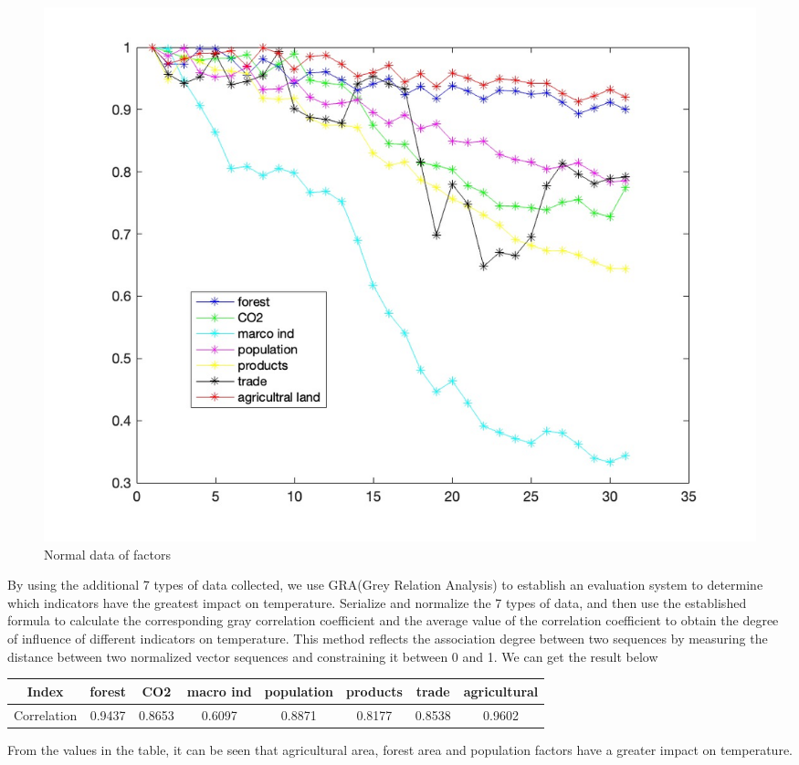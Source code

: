 \documentclass{apmcmthesis}
\begin{document}
\begin{figure}[htbp]
  \centering
  \includegraphics[scale=0.25]{2c2.jpg}
  \caption{Normal data of factors}
\end{figure}

By using the additional 7 types of data collected, we use GRA(Grey Relation Analysis) to establish an evaluation system to determine which indicators have the greatest impact on temperature.
Serialize and normalize the 7 types of data, and then use the established formula to calculate the corresponding gray correlation coefficient and the average value of the correlation coefficient to obtain the degree of influence of different indicators on temperature. This method reflects the association degree between two sequences by measuring the distance between two normalized vector sequences and constraining it between 0 and 1.
We can get the result below
\begin{center}
  \begin{tabular}{c|ccccccc}
    \hline
    Index &forest& CO2 & macro ind & population & products & trade & agricultural\\
    \hline
    Correlation & 0.9437&	0.8653&	0.6097&	0.8871&	0.8177&	0.8538&	0.9602\\
    \hline
    \end{tabular}
\end{center}

From the values in the table, it can be seen that agricultural area, forest area and population factors have a greater impact on temperature. 
\end{document}
